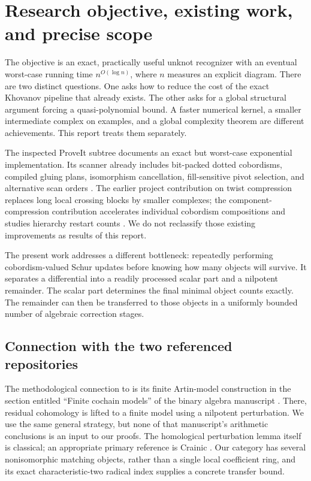 \documentclass[11pt,letterpaper]{article}
\theoremstyle{definition}
\theoremstyle{remark}
\newcommand{\code}[1]{\texttt{\detokenize{#1}}}
\begin{document}
\section{Research objective, existing work, and precise scope}
\label{sec:scope}
The objective is an exact, practically useful unknot recognizer with an eventual
worst-case running time $n^{O(\log n)}$, where $n$ measures an explicit diagram.
There are two distinct questions. One asks how to reduce the cost of the exact
Khovanov pipeline that already exists. The other asks for a global structural
argument forcing a quasi-polynomial bound. A faster numerical kernel, a smaller
intermediate complex on examples, and a global complexity theorem are different
achievements. This report treats them separately.

The inspected ProveIt subtree documents an exact but worst-case exponential
implementation. Its scanner already includes bit-packed dotted cobordisms,
compiled gluing plans, isomorphism cancellation, fill-sensitive pivot selection,
and alternative scan orders \cite{proveit}. The earlier project contribution on
twist compression replaces long local crossing blocks by smaller complexes;
the component-compression contribution accelerates individual cobordism
compositions and studies hierarchy restart counts \cite{twist,component}.
We do not reclassify those existing improvements as results of this report.

The present work addresses a different bottleneck: repeatedly performing
cobordism-valued Schur updates before knowing how many objects will survive.
It separates a differential into a readily processed scalar part and a nilpotent
remainder. The scalar part determines the final minimal object counts exactly.
The remainder can then be transferred to those objects in a uniformly bounded
number of algebraic correction stages.

\subsection{Connection with the two referenced repositories}
The methodological connection to \code{openai/math} is its finite Artin-model
construction in the section entitled ``Finite cochain models'' of the binary
algebra manuscript \cite{mathrepo}. There, residual cohomology is lifted to a
finite model using a nilpotent perturbation. We use the same general strategy,
but none of that manuscript's arithmetic conclusions is an input to our proofs.
The homological perturbation lemma itself is classical; an appropriate primary
reference is Crainic \cite{crainic}. Our category has several nonisomorphic
matching objects, rather than a single local coefficient ring, and its exact
characteristic-two radical index supplies a concrete transfer bound.
\end{document}
